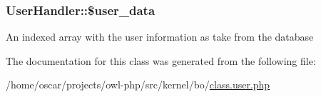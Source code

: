 \subsubsection[{\$user\_\-data}]{\setlength{\rightskip}{0pt plus 5cm}UserHandler::\$user\_\-data}\label{classUserHandler_ae7a2d59eee65560ac96b860e828bb445}
An indexed array with the user information as take from the database 

The documentation for this class was generated from the following file:\begin{DoxyCompactItemize}
\item 
/home/oscar/projects/owl-\/php/src/kernel/bo/\hyperlink{class_8user_8php}{class.user.php}\end{DoxyCompactItemize}
